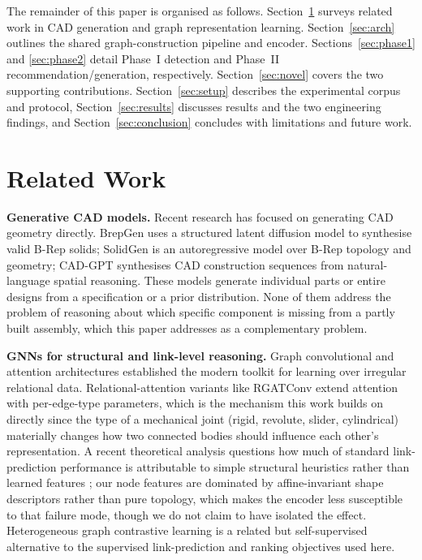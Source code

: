 \documentclass[sn-mathphys,Numbered]{sn-jnl}
\begin{document}
The remainder of this paper is organised as follows. Section~\ref{sec:related} surveys related work in CAD generation and graph representation learning. Section~\ref{sec:arch} outlines the shared graph-construction pipeline and encoder. Sections~\ref{sec:phase1} and \ref{sec:phase2} detail Phase~I detection and Phase~II recommendation/generation, respectively. Section~\ref{sec:novel} covers the two supporting contributions. Section~\ref{sec:setup} describes the experimental corpus and protocol, Section~\ref{sec:results} discusses results and the two engineering findings, and Section~\ref{sec:conclusion} concludes with limitations and future work.

\section{Related Work}\label{sec:related}

\textbf{Generative CAD models.} Recent research has focused on generating CAD geometry directly. BrepGen \cite{brepgen2024} uses a structured latent diffusion model to synthesise valid B-Rep solids; SolidGen \cite{solidgen2024} is an autoregressive model over B-Rep topology and geometry; CAD-GPT \cite{cadgpt2025} synthesises CAD construction sequences from natural-language spatial reasoning. These models generate individual parts or entire designs from a specification or a prior distribution. None of them address the problem of reasoning about which specific component is missing from a partly built assembly, which this paper addresses as a complementary problem.

\textbf{GNNs for structural and link-level reasoning.} Graph convolutional and attention architectures \cite{kipf2017gcn,velickovic2018gat,hamilton2017sage} established the modern toolkit for learning over irregular relational data. Relational-attention variants like RGATConv \cite{busbridge2019rgat} extend attention with per-edge-type parameters, which is the mechanism this work builds on directly since the type of a mechanical joint (rigid, revolute, slider, cylindrical) materially changes how two connected bodies should influence each other's representation. A recent theoretical analysis questions how much of standard link-prediction performance is attributable to simple structural heuristics rather than learned features \cite{linkheuristics2024}; our node features are dominated by affine-invariant shape descriptors rather than pure topology, which makes the encoder less susceptible to that failure mode, though we do not claim to have isolated the effect. Heterogeneous graph contrastive learning \cite{heterognn2023} is a related but self-supervised alternative to the supervised link-prediction and ranking objectives used here.
\end{document}
